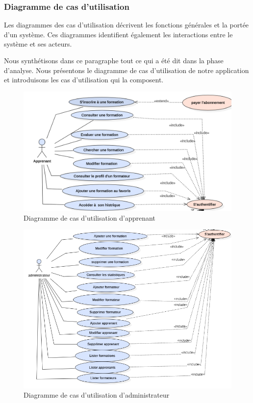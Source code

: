 \subsubsection{Diagramme de cas d’utilisation}

Les diagrammes des cas d'utilisation décrivent les fonctions générales et la portée d'un système. Ces diagrammes identifient également les interactions entre le système et ses acteurs.

Nous synthétisons dans ce paragraphe tout ce qui a été dit dans la phase d’analyse. Nous présentons le diagramme de cas d’utilisation de notre application et introduisons les cas d’utilisation qui la composent.

\begin{figure}[H]
    \centering
    \includegraphics[width=15cm]{Figures/apprenant.PNG}
    \caption{Diagramme de cas d’utilisation d'apprenant}
\end{figure}

\begin{figure}[H]
    \centering
    \includegraphics[width=13cm]{Figures/administrateur.PNG}
    \caption{Diagramme de cas d’utilisation d'administrateur}
\end{figure}

